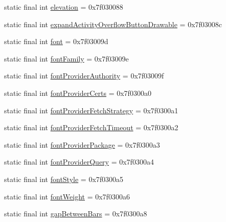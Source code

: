 \begin{DoxyCompactItemize}
\item 
static final int \mbox{\hyperlink{classandroid_1_1support_1_1v7_1_1appcompat_1_1_r_1_1attr_a857db0711c5ee6c5f31d51c0e1dcf793}{elevation}} = 0x7f030088
\item 
static final int \mbox{\hyperlink{classandroid_1_1support_1_1v7_1_1appcompat_1_1_r_1_1attr_a08db43c910c44c3cd8ba06573e44e88b}{expand\+Activity\+Overflow\+Button\+Drawable}} = 0x7f03008c
\item 
static final int \mbox{\hyperlink{classandroid_1_1support_1_1v7_1_1appcompat_1_1_r_1_1attr_ad7c911a2663c252f2d011c67d6d33f32}{font}} = 0x7f03009d
\item 
static final int \mbox{\hyperlink{classandroid_1_1support_1_1v7_1_1appcompat_1_1_r_1_1attr_a23ba4ab31bcc6fba9c333a422f32225f}{font\+Family}} = 0x7f03009e
\item 
static final int \mbox{\hyperlink{classandroid_1_1support_1_1v7_1_1appcompat_1_1_r_1_1attr_a6d9eab813186f61e2ab0fb992a1de67c}{font\+Provider\+Authority}} = 0x7f03009f
\item 
static final int \mbox{\hyperlink{classandroid_1_1support_1_1v7_1_1appcompat_1_1_r_1_1attr_a8896916d3b03e9285f748bbe64d43273}{font\+Provider\+Certs}} = 0x7f0300a0
\item 
static final int \mbox{\hyperlink{classandroid_1_1support_1_1v7_1_1appcompat_1_1_r_1_1attr_a1e7762850bad8d88a305007c33b586f6}{font\+Provider\+Fetch\+Strategy}} = 0x7f0300a1
\item 
static final int \mbox{\hyperlink{classandroid_1_1support_1_1v7_1_1appcompat_1_1_r_1_1attr_ae21b6976cce755ba80181256b88870c9}{font\+Provider\+Fetch\+Timeout}} = 0x7f0300a2
\item 
static final int \mbox{\hyperlink{classandroid_1_1support_1_1v7_1_1appcompat_1_1_r_1_1attr_a37cf5bedfb875a1f08ee163cc7a02f78}{font\+Provider\+Package}} = 0x7f0300a3
\item 
static final int \mbox{\hyperlink{classandroid_1_1support_1_1v7_1_1appcompat_1_1_r_1_1attr_a12072243f55422a8b0f28aba4b37c91f}{font\+Provider\+Query}} = 0x7f0300a4
\item 
static final int \mbox{\hyperlink{classandroid_1_1support_1_1v7_1_1appcompat_1_1_r_1_1attr_a5cd9d3802faace589facf6430a60d61f}{font\+Style}} = 0x7f0300a5
\item 
static final int \mbox{\hyperlink{classandroid_1_1support_1_1v7_1_1appcompat_1_1_r_1_1attr_a39b82d4183c0aee73623493a08ab0dd0}{font\+Weight}} = 0x7f0300a6
\item 
static final int \mbox{\hyperlink{classandroid_1_1support_1_1v7_1_1appcompat_1_1_r_1_1attr_a37cf66ba61ecfae3c1d28ee79d9ef459}{gap\+Between\+Bars}} = 0x7f0300a8

\end{DoxyCompactItemize}
